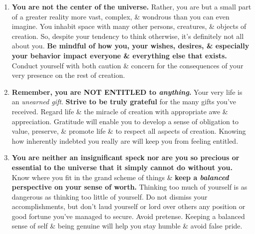 \documentclass{article}
\numberwithin{equation}{section}
\begin{document}
\begin{enumerate}
	\item \textbf{You are not the center of the universe.} Rather, you are but a small part of a greater reality more vast, complex, \& wondrous than you can even imagine. You inhabit space with many other persons, creatures, \& objects of creation. So, despite your tendency to think otherwise, it's definitely not all about you. \textbf{Be mindful of how you, your wishes, desires, \& especially your behavior impact everyone \& everything else that exists.} Conduct yourself with both caution \& concern for the consequences of your very presence on the rest of creation.
	\item \textbf{Remember, you are NOT ENTITLED to \textit{anything}.} Your very life is an \textit{unearned gift}. \textbf{Strive to be truly grateful} for the many gifts you've received. Regard life \& the miracle of creation with appropriate awe \& appreciation. Gratitude will enable you to develop a sense of obligation to value, preserve, \& promote life \& to respect all aspects of creation. Knowing how inherently indebted you really are will keep you from feeling entitled.
	\item \textbf{You are neither an insignificant speck nor are you so precious or essential to the universe that it simply cannot do without you.} Know where you fit in the grand scheme of things \& \textbf{keep a \textit{balanced} perspective on your sense of worth.} Thinking too much of yourself is as dangerous as thinking too little of yourself. Do not dismiss your accomplishments, but don't laud yourself or lord over others any position or good fortune you've managed to secure. Avoid pretense. Keeping a balanced sense of self \& being genuine will help you stay humble \& avoid false pride.
	

\end{enumerate}
\end{document}
